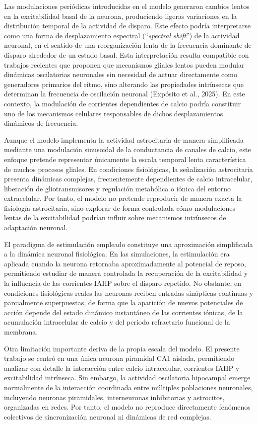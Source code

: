 \documentclass[12pt,a4paper]{report}
\begin{document}
Las modulaciones periódicas introducidas en el modelo generaron cambios lentos en la excitabilidad basal de la neurona, produciendo ligeras variaciones en la distribución temporal de la actividad de disparo. Este efecto podría interpretarse como una forma de desplazamiento espectral (“\textit{spectral shift}”) de la actividad neuronal, en el sentido de una reorganización lenta de la frecuencia dominante de disparo alrededor de un estado basal. Esta interpretación resulta compatible con trabajos recientes que proponen que mecanismos gliales lentos pueden modular dinámicas oscilatorias neuronales sin necesidad de actuar directamente como generadores primarios del ritmo, sino alterando las propiedades intrínsecas que determinan la frecuencia de oscilación neuronal (Expósito et al., 2025). En este contexto, la modulación de corrientes dependientes de calcio podría constituir uno de los mecanismos celulares responsables de dichos desplazamientos dinámicos de frecuencia. 

Aunque el modelo implementa la actividad astrocitaria de manera simplificada mediante una modulación sinusoidal de la conductancia de canales de calcio, este enfoque pretende representar únicamente la escala temporal lenta característica de muchos procesos gliales. En condiciones fisiológicas, la señalización astrocitaria presenta dinámicas complejas, frecuentemente dependientes de calcio intracelular, liberación de gliotransmisores y regulación metabólica o iónica del entorno extracelular. Por tanto, el modelo no pretende reproducir de manera exacta la fisiología astrocitaria, sino explorar de forma controlada cómo modulaciones lentas de la excitabilidad podrían influir sobre mecanismos intrínsecos de adaptación neuronal.

El paradigma de estimulación empleado constituye una aproximación simplificada a la dinámica neuronal fisiológica. En las simulaciones, la estimulación era aplicada cuando la neurona retornaba aproximadamente al potencial de reposo, permitiendo estudiar de manera controlada la recuperación de la excitabilidad y la influencia de las corrientes IAHP sobre el disparo repetido. No obstante, en condiciones fisiológicas reales las neuronas reciben entradas sinápticas continuas y parcialmente superpuestas, de forma que la aparición de nuevos potenciales de acción depende del estado dinámico instantáneo de las corrientes iónicas, de la acumulación intracelular de calcio y del periodo refractario funcional de la membrana.

Otra limitación importante deriva de la propia escala del modelo. El presente trabajo se centró en una única neurona piramidal CA1 aislada, permitiendo analizar con detalle la interacción entre calcio intracelular, corrientes IAHP y excitabilidad intrínseca. Sin embargo, la actividad oscilatoria hipocampal emerge normalmente de la interacción coordinada entre múltiples poblaciones neuronales, incluyendo neuronas piramidales, interneuronas inhibitorias y astrocitos, organizadas en redes. Por tanto, el modelo no reproduce directamente fenómenos colectivos de sincronización neuronal ni dinámicas de red complejas. 
\end{document}
